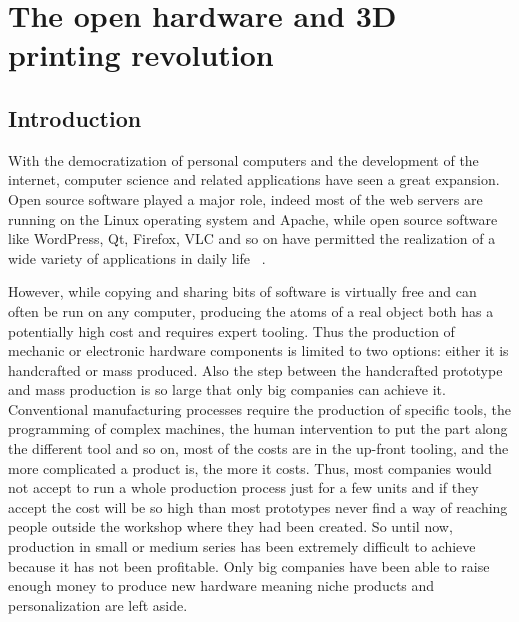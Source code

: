 
\cleartoleftpage


\chapter{The open hardware and 3D printing revolution}



\section{Introduction} %

With the democratization of personal computers and the development of the internet, computer science and related applications have seen a great expansion. Open source software played a major role, indeed most of the web servers are running on the Linux operating system and Apache, while open source software like WordPress, Qt, Firefox, VLC and so on have permitted the realization of a wide variety of applications in daily life ~\parencite{peeling2001analysis}.

However, while copying and sharing bits of software is virtually free and can often be run on any computer, producing the atoms of a real object both has a potentially high cost and requires expert tooling. Thus the production of mechanic or electronic hardware components is limited to two options: either it is handcrafted or mass produced. Also the step between the handcrafted prototype and mass production is so large that only big companies can achieve it. Conventional manufacturing processes require the production of specific tools, the programming of complex machines, the human intervention to put the part along the different tool and so on, most of the costs are in the up-front tooling, and the more complicated a product is, the more it costs. Thus, most companies would not accept to run a whole production process just for a few units and if they accept the cost will be so high than most prototypes never find a way of reaching people outside the workshop where they had been created. So until now, production in small or medium series has been extremely difficult to achieve because it has not been profitable.
Only big companies have been able to raise enough money to produce new hardware meaning niche products and personalization are left aside.

